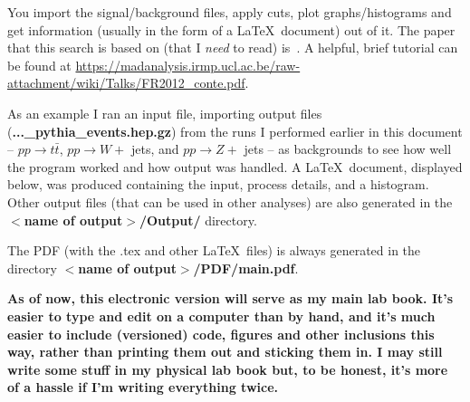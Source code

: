 You import the signal/background files, apply cuts, plot graphs/histograms and get information (usually in the form of a \LaTeX\ document) out of it. The paper that this search is based on (that I \emph{need} to read) is~\cite{ATLAS-CONF-2016-019}. A helpful, brief tutorial can be found at \url{https://madanalysis.irmp.ucl.ac.be/raw-attachment/wiki/Talks/FR2012_conte.pdf}.

As an example I ran an input file, importing \madgraph output files (\textbf{...\_pythia\_events.hep.gz}) from the runs I performed earlier in this document -- $pp \rightarrow t\bar{t}$, $pp \rightarrow W +$ jets, and $pp \rightarrow Z +$ jets -- as backgrounds to see how well the program worked and how output was handled. A \LaTeX\ document, displayed below, was produced containing the input, process details, and a histogram. Other output files (that can be used in other analyses) are also generated in the \textbf{$<$name of output$>$/Output/} directory.

The PDF (with the .tex and other \LaTeX\ files) is always generated in the directory \textbf{$<$name of output$>$/PDF/main.pdf}.

\textbf{As of now, this electronic version will serve as my main lab book. It's easier to type and edit on a computer than by hand, and it's much easier to include (versioned) code, figures and other inclusions this way, rather than printing them out and sticking them in. I may still write some stuff in my physical lab book but, to be honest, it's more of a hassle if I'm writing everything twice.}
